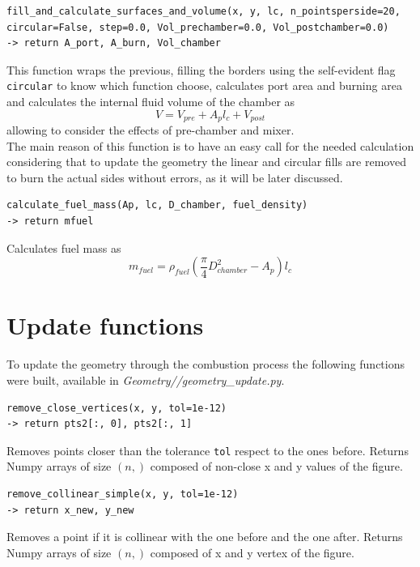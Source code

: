\begin{verbatim}
fill_and_calculate_surfaces_and_volume(x, y, lc, n_pointsperside=20, 
circular=False, step=0.0, Vol_prechamber=0.0, Vol_postchamber=0.0)
-> return A_port, A_burn, Vol_chamber
\end{verbatim}
This function wraps the previous, filling the borders using the self-evident flag \verb|circular| to know which function choose, calculates port area and burning area and calculates the internal fluid volume of the chamber as
\begin{equation}
    V = V_{pre} + A_pl_c + V_{post} 
\end{equation}
allowing to consider the effects of pre-chamber and mixer.\\
The main reason of this function is to have an easy call for the needed calculation considering that to update the geometry the linear and circular fills are removed to burn the actual sides without errors, as it will be later discussed.

\begin{verbatim}
calculate_fuel_mass(Ap, lc, D_chamber, fuel_density)
-> return mfuel
\end{verbatim}
\hspace*{2em} Calculates fuel mass as
\begin{equation}
    m_{fuel}=\rho_{fuel}(\frac{\pi}{4}D_{chamber}^2 - A_p)l_c
\end{equation}

\section{Update functions}
To update the geometry through the combustion process the following functions were built, available in \textit{Geometry//geometry_update.py}. 
\begin{verbatim}
remove_close_vertices(x, y, tol=1e-12)
-> return pts2[:, 0], pts2[:, 1]
\end{verbatim}
\hspace*{2em} Removes points closer than the tolerance \verb|tol| respect to the ones before. Returns Numpy arrays of size $(n,)$ composed of non-close x and y values of the figure.

\begin{verbatim}
remove_collinear_simple(x, y, tol=1e-12)
-> return x_new, y_new
\end{verbatim}
\hspace*{2em} Removes a point if it is collinear with the one before and the one after.  Returns Numpy arrays of size $(n,)$ composed of x and y vertex of the figure.


